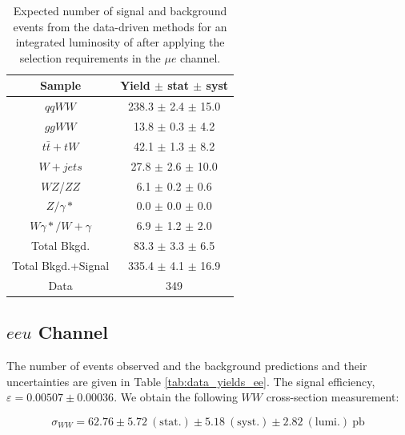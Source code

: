 \begin{table}[ht!]
  \begin{center}
  \begin{tabular} {|c|c|}
\hline
Sample                & Yield $\pm$ stat $\pm$ syst \\ \hline \hline
$qqWW$                & 238.3 $\pm$  2.4 $\pm$ 15.0  \\ \hline
$ggWW$                & 13.8 $\pm$  0.3 $\pm$  4.2  \\ \hline
$t\bar{t} + tW$      & 42.1 $\pm$  1.3 $\pm$  8.2  \\ \hline
$W+jets$              & 27.8 $\pm$  2.6 $\pm$ 10.0  \\ \hline
$WZ$/$ZZ$             &  6.1 $\pm$  0.2 $\pm$  0.6  \\ \hline
$Z/\gamma*$          &  0.0 $\pm$  0.0 $\pm$  0.0  \\ \hline
$W\gamma*/W+\gamma$ &  6.9 $\pm$  1.2 $\pm$  2.0  \\ \hline \hline
Total Bkgd.           & 83.3 $\pm$  3.3 $\pm$  6.5  \\ \hline \hline
Total Bkgd.+Signal    & 335.4 $\pm$  4.1 $\pm$ 16.9  \\ \hline \hline
Data                  & 349 \\ \hline
\end{tabular}
  \caption{Expected number of signal and background events from the data-driven methods for
  an integrated luminosity of \intlumi after applying the selection requirements in the $\mu e$ channel.}
   \label{tab:data_yields_me}
  \end{center}
\end{table}

%
%
%
\subsection{$eeu$ Channel}

The number of events observed and the background predictions and their uncertainties are
given in Table \ref{tab:data_yields_ee}.
The signal efficiency,  $\varepsilon = 0.00507 \pm 0.00036$.
We obtain the following $WW$ cross-section measurement:

\begin{equation*}
\sigma_{WW}  = 62.76 \pm 5.72~\mathrm{(stat.)} \pm 5.18~\mathrm{(syst.)} \pm 2.82~\mathrm{(lumi.)~pb} 
\end{equation*}

